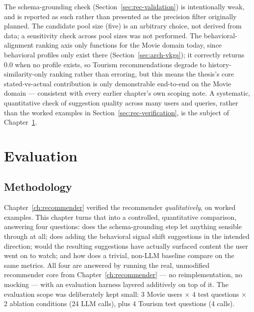 \documentclass[11pt,a4paper,oneside]{book}
\begin{document}
The schema-grounding check (Section~\ref{sec:rec-validation}) is intentionally weak, and is reported
as such rather than presented as the precision filter originally planned. The candidate pool size
(five) is an arbitrary choice, not derived from data; a sensitivity check across pool sizes was not
performed. The behavioral-alignment ranking axis only functions for the Movie domain today, since
behavioral profiles only exist there (Section~\ref{sec:arch-vkgs}); it correctly returns $0.0$ when
no profile exists, so Tourism recommendations degrade to history-similarity-only ranking rather than
erroring, but this means the thesis's core stated-vs-actual contribution is only demonstrable
end-to-end on the Movie domain --- consistent with every earlier chapter's own scoping note. A
systematic, quantitative check of suggestion quality across many users and queries, rather than the
worked examples in Section~\ref{sec:rec-verification}, is the subject of Chapter~\ref{ch:eval}.

\chapter{Evaluation}
\label{ch:eval}

\section{Methodology}
\label{sec:eval-method}

Chapter~\ref{ch:recommender} verified the recommender \emph{qualitatively}, on worked examples. This
chapter turns that into a controlled, quantitative comparison, answering four questions: does the
schema-grounding step let anything sensible through at all; does adding the behavioral signal shift
suggestions in the intended direction; would the resulting suggestions have actually surfaced
content the user went on to watch; and how does a trivial, non-LLM baseline compare on the same
metrics. All four are answered by running the real, unmodified recommender core from
Chapter~\ref{ch:recommender} --- no reimplementation, no mocking --- with an evaluation harness
layered additively on top of it. The evaluation scope was deliberately kept small: 3 Movie users
$\times$ 4 test questions $\times$ 2 ablation conditions (24 LLM calls), plus 4 Tourism test
questions (4 calls).
\end{document}
